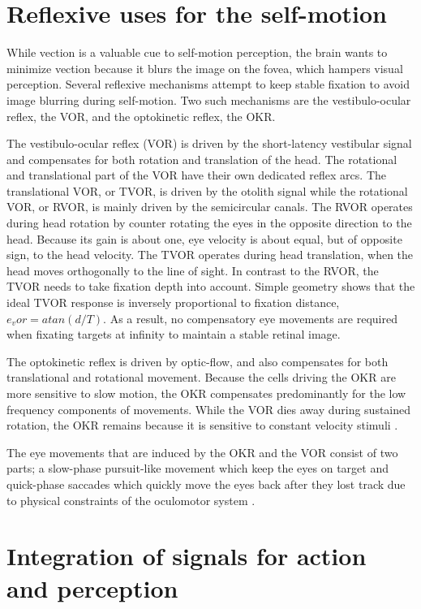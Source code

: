 \section{Reflexive uses for the self-motion}
While vection is a valuable cue to self-motion perception, the brain wants to minimize vection because it blurs the image on the fovea, which hampers visual perception. Several reflexive mechanisms attempt to keep stable fixation to avoid image blurring during self-motion. Two such mechanisms are the vestibulo-ocular reflex, the VOR, and the optokinetic reflex, the OKR.

The vestibulo-ocular reflex (VOR) is driven by the short-latency vestibular signal and compensates for both rotation and translation of the head. The rotational and translational part of the VOR have their own dedicated reflex arcs. The translational VOR, or TVOR, is driven by the otolith signal while the rotational VOR, or RVOR, is mainly driven by the semicircular canals. The RVOR operates during head rotation by counter rotating the eyes in the opposite direction to the head. Because its gain is about one, eye velocity is about equal, but of opposite sign, to the head velocity. The TVOR operates during head translation, when the head moves orthogonally to the line of sight. In contrast to the RVOR, the TVOR needs to take fixation depth into account. Simple geometry shows that the ideal TVOR response is inversely proportional to fixation distance, $e_vor = atan⁡(d/T)$. As a result, no compensatory eye movements are required when fixating targets at infinity to maintain a stable retinal image. 

The optokinetic reflex is driven by optic-flow, and also compensates for both translational and rotational movement. Because the cells driving the OKR are more sensitive to slow motion, the OKR compensates predominantly for the low frequency components of movements. While the VOR dies away during sustained rotation, the OKR remains because it is sensitive to constant velocity stimuli \cite{soodak1988}.

The eye movements that are induced by the OKR and the VOR consist of two parts; a slow-phase pursuit-like movement which keep the eyes on target and quick-phase saccades which quickly move the eyes back after they lost track due to physical constraints of the oculomotor system \cite{goldberg2012}.

\section{Integration of signals for action and perception}

